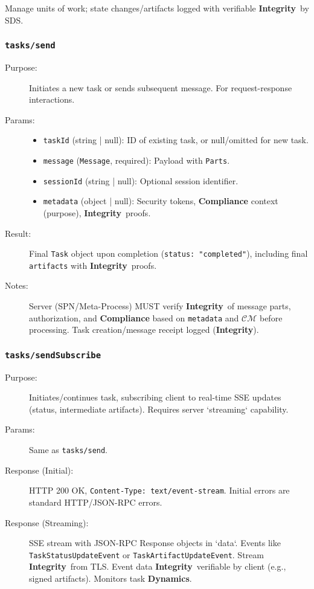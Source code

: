 \documentclass[12pt,a4paper]{report}
\newcommand{\Integrity}{\textbf{Integrity}}
\newcommand{\Dynamics}{\textbf{Dynamics}}
\begin{document}
	Manage units of work; state changes/artifacts logged with verifiable \Integrity\ by SDS.
	
	\subsubsection{\texttt{tasks/send}}
	\label{app:oami_tasks_send}
	\begin{description}
		\item[Purpose:] Initiates a new task or sends subsequent message. For request-response interactions.
		\item[Params:]
		\begin{itemize} \itemsep0em
			\item \texttt{taskId} (string | null): ID of existing task, or null/omitted for new task.
			\item \texttt{message} (\texttt{Message}, required): Payload with \texttt{Parts}.
			\item \texttt{sessionId} (string | null): Optional session identifier.
			\item \texttt{metadata} (object | null): Security tokens, \textbf{Compliance} context (purpose), \Integrity\ proofs.
		\end{itemize}
		\item[Result:] Final \texttt{Task} object upon completion (\texttt{status: "completed"}), including final \texttt{artifacts} with \Integrity\ proofs.
		\item[Notes:] Server (SPN/Meta-Process) MUST verify \Integrity\ of message parts, authorization, and \textbf{Compliance} based on \texttt{metadata} and $\mathcal{CM}$ before processing. Task creation/message receipt logged (\Integrity).
	\end{description}
	
	\subsubsection{\texttt{tasks/sendSubscribe}}
	\label{app:oami_tasks_sendsubscribe}
	\begin{description}
		\item[Purpose:] Initiates/continues task, subscribing client to real-time SSE updates (status, intermediate artifacts). Requires server `streaming` capability.
		\item[Params:] Same as \texttt{tasks/send}.
		\item[Response (Initial):] HTTP 200 OK, \texttt{Content-Type: text/event-stream}. Initial errors are standard HTTP/JSON-RPC errors.
		\item[Response (Streaming):] SSE stream with JSON-RPC Response objects in `data`. Events like \texttt{TaskStatusUpdateEvent} or \texttt{TaskArtifactUpdateEvent}. Stream \Integrity\ from TLS. Event data \Integrity\ verifiable by client (e.g., signed artifacts). Monitors task \Dynamics.
	\end{description}
	
\end{document}
